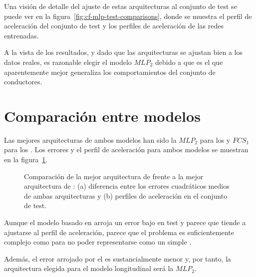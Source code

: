 Una visión de detalle del ajuste de estas arquitecturas al conjunto de test se puede ver en la figura~\ref{fig:cf-mlp-test-comparisons}, donde se muestra el perfil de aceleración del conjunto de test y los perfiles de aceleración de las redes entrenadas.

A la vista de los resultados, y dado que las arquitecturas se ajustan bien a los datos reales, es razonable elegir el modelo $MLP_2$ debido a que es el que aparentemente mejor generaliza los comportamientos del conjunto de conductores.

\section{Comparación entre modelos}

Las mejores arquitecturas de ambos modelos han sido la $MLP_2$ para los  y $FCS_1$ para los . Los errores y el perfil de aceleración para ambos modelos se muestran en la figura~\ref{fig:cf-comparison-between-best-mlp-and-fcs-architecture}.

\begin{figure}
	\centering
	\qquad
	\caption[Comparación entre los dos tipos de modelo longitudinal]{Comparación de la mejor arquitectura de  frente a la mejor arquitectura de : (a) diferencia entre los errores cuadráticos medios de ambas arquitecturas y (b) perfiles de aceleración en el conjunto de test.}
	\label{fig:cf-comparison-between-best-mlp-and-fcs-architecture}
\end{figure}

Aunque el modelo basado en  arroja un error bajo en test y parece que tiende a ajustarse al perfil de aceleración, parece que el problema es suficientemente complejo como para no poder representarse como un simple .

Además, el error arrojado por el  es sustancialmente menor y, por tanto, la arquitectura elegida para el modelo longitudinal será la $MLP_2$.

